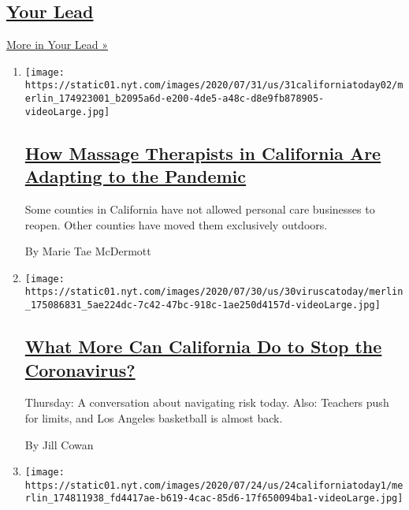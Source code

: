 \hypertarget{your-lead}{%
\subsection{\texorpdfstring{\href{/series/your-lead}{Your
Lead}}{Your Lead}}\label{your-lead}}

\href{/series/your-lead}{More in Your Lead »}

\begin{enumerate}
\def\labelenumi{\arabic{enumi}.}
\item
  \texttt{[image: https://static01.nyt.com/images/2020/07/31/us/31californiatoday02/merlin\_174923001\_b2095a6d-e200-4de5-a48c-d8e9fb878905-videoLarge.jpg]}

  \hypertarget{how-massage-therapists-in-california-are-adapting-to-the-pandemic}{%
  \subsection{\texorpdfstring{\href{/2020/07/31/us/essential-workers-massage-therapists.html}{How
  Massage Therapists in California Are Adapting to the
  Pandemic}}{How Massage Therapists in California Are Adapting to the Pandemic}}\label{how-massage-therapists-in-california-are-adapting-to-the-pandemic}}

  Some counties in California have not allowed personal care businesses
  to reopen. Other counties have moved them exclusively outdoors.

  By Marie Tae McDermott
\item
  \texttt{[image: https://static01.nyt.com/images/2020/07/30/us/30viruscatoday/merlin\_175086831\_5ae224dc-7c42-47bc-918c-1ae250d4157d-videoLarge.jpg]}

  \hypertarget{what-more-can-california-do-to-stop-the-coronavirus}{%
  \subsection{\texorpdfstring{\href{/2020/07/30/us/coronavirus-california-health-equity.html}{What
  More Can California Do to Stop the
  Coronavirus?}}{What More Can California Do to Stop the Coronavirus?}}\label{what-more-can-california-do-to-stop-the-coronavirus}}

  Thursday: A conversation about navigating risk today. Also: Teachers
  push for limits, and Los Angeles basketball is almost back.

  By Jill Cowan
\item
  \texttt{[image: https://static01.nyt.com/images/2020/07/24/us/24californiatoday1/merlin\_174811938\_fd4417ae-b619-4cac-85d6-17f650094ba1-videoLarge.jpg]}


\end{enumerate}
